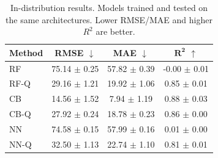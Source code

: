 \begin{table}[t]
    \centering
    \caption{In-distribution results. Models trained and tested on the same architectures. Lower RMSE/MAE and higher $R^2$ are better.}
    \label{tab:id-results}
    \begin{tabular}{lccc}
        \toprule
        \textbf{Method} & \textbf{RMSE} $\downarrow$ & \textbf{MAE} $\downarrow$ & $\boldsymbol{R^2}$ $\uparrow$ \\
        \midrule
        RF      & 75.14 $\pm$ 0.25 & 57.82 $\pm$ 0.39 & -0.00 $\pm$ 0.01 \\
        RF-Q    & 29.16 $\pm$ 1.21 & 19.92 $\pm$ 1.06 & 0.85 $\pm$ 0.01 \\
        \midrule
        CB      & 14.56 $\pm$ 1.52 & 7.94 $\pm$ 1.19 & 0.88 $\pm$ 0.03 \\
        CB-Q    & 27.92 $\pm$ 0.24 & 18.78 $\pm$ 0.23 & 0.86 $\pm$ 0.00 \\
        \midrule
        NN      & 74.58 $\pm$ 0.15 & 57.99 $\pm$ 0.16 & 0.01 $\pm$ 0.00 \\
        NN-Q    & 32.50 $\pm$ 1.13 & 22.74 $\pm$ 1.10 & 0.81 $\pm$ 0.01 \\
        \bottomrule
    \end{tabular}
\end{table}